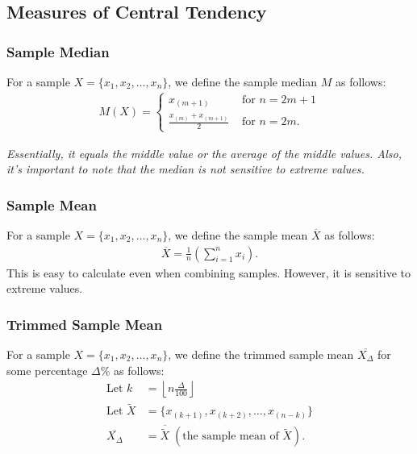 \documentclass[a4paper, 12pt, twoside]{article}
\def\lf{\left\lfloor}
\def\rf{\right\rfloor}
\begin{document}
\subsection{Measures of Central Tendency}

\subsubsection{Sample Median}

For a sample $X = \{x_1, x_2, \ldots, x_n\}$, we define the sample
median $M$ as follows:
\begin{align*}
    M(X) = \begin{cases}
        x_{(m + 1)}                     & \text{ for } n = 2m + 1 \\
        \frac{x_{(m)} + x_{(m + 1)}}{2} & \text{ for } n = 2m.
    \end{cases}
\end{align*}

\textit{Essentially, it equals the middle value or the average of the
    middle values. Also, it's important to note that the median is not
    sensitive to extreme values.}

\subsubsection{Sample Mean}

For a sample $X = \{x_1, x_2, \ldots, x_n\}$, we define the sample
mean $\overline{X}$ as follows:
\begin{align*}
    \overline{X} = \frac{1}{n}\left(\sum_{i = 1}^{n} x_i \right).
\end{align*}
This is easy to calculate even when combining samples. However, it is
sensitive to extreme values.

\subsubsection{Trimmed Sample Mean}

For a sample $X = \{x_1, x_2, \ldots, x_n\}$, we define the trimmed
sample mean $\overline{X_\Delta}$ for some percentage $\Delta\%$ as follows:
\begin{align*}
    \text{Let } k         & = \lf n \frac{\Delta}{100} \rf \\
    \text{Let } \tilde{X} & = \{x_{(k + 1)}, x_{(k + 2)},
    \ldots, x_{(n - k)}\}                                  \\
    \overline{X_\Delta}   & = \overline{\tilde{X}} \;
    (\text{the sample mean of } \tilde{X}).
\end{align*}
\end{document}
